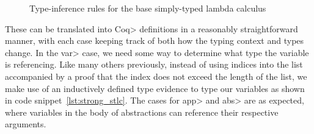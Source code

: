   \begin{figure}
    \caption{Type-inference rules for the base simply-typed lambda calculus}
    \label{fig:base_infer}
  \end{figure}

  These can be translated into \<Coq> definitions in a reasonably straightforward manner, with each case keeping track of both how the typing context and types change.
  In the \<var> case, we need some way to determine what type the variable is referencing.
  Like many others previously\cite{Benton2011}\cite{Coquand1994}, instead of using indices into the list accompanied by a proof that the index does not exceed the length of the list, we make use of an inductively defined type evidence to type our variables as shown in code snippet~\ref{lst:strong_stlc}.
  The cases for \<app> and \<abs> are as expected, where variables in the body of abstractions can reference their respective arguments.

